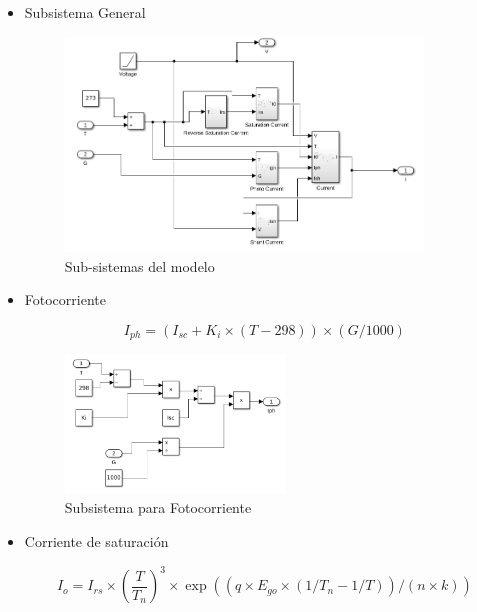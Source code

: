 \documentclass[a4paper,12pt]{article}
\begin{document}
	\begin{itemize}
		\item Subsistema General
		
		\begin{figure}[htb]
			\centering
			\includegraphics[width=0.9\textwidth]{./imagenes/simulink2.png}
			\caption{Sub-sistemas del modelo}
		\end{figure}
		
		
		\item Fotocorriente
		
		
		
		\begin{equation*}
			I_{ph} = \left(I_{sc} + K_i \times \left(T - 298 \right) \right) \times \left(G/1000 \right)
		\end{equation*}
		
		\begin{figure}[h!]
			\centering
			\includegraphics[width=0.55\textwidth]{./imagenes/simulink3.png}
			\caption{Subsistema para Fotocorriente}
		\end{figure} 
	
		\newpage
		
		\item Corriente de saturación
		
		\begin{equation*}
			I_o = I_{rs} \times \left( \frac{T}{T_n} \right)^3 \times \exp \left( \left( q \times E_{go} \times \left(1/T_n - 1/T \right) \right)/ \left(n \times k \right) \right)
		\end{equation*}
		

\end{itemize}
\end{document}
